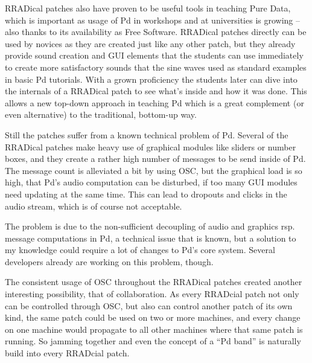 \documentclass[10pt,english]{scrartcl}
\begin{document}
RRADical patches also have proven to be useful tools in teaching Pure Data,
which is important as usage of Pd in workshops and at universities is
growing -- also thanks to its availability as Free Software. RRADical
patches directly can be used by novices as they are created just like any
other patch, but they already provide sound creation and GUI elements that
the students can use immediately to create more satisfactory sounds that the
sine waves used as standard examples in basic Pd tutorials. With a grown
proficiency the students later can dive into the internals of a RRADical
patch to see what's inside and how it was done.  This allows a new top-down
approach in teaching Pd which is a great complement (or even alternative) to
the traditional, bottom-up way.

Still the patches suffer from a known technical problem of Pd. Several of
the RRADical patches make heavy use of graphical modules like sliders or
number boxes, and they create a rather high number of messages to be send
inside of Pd. The message count is alleviated a bit by using OSC, but the
graphical load is so high, that Pd's audio computation can be disturbed, if
too many GUI modules need updating at the same time. This can lead to
dropouts and clicks in the audio stream, which is of course not acceptable.

The problem is due to the non-sufficient decoupling of audio and graphics
rsp. message computations in Pd, a technical issue that is known, but a
solution to my knowledge could require a lot of changes to Pd's core system.
Several developers already are working on this problem, though.

The consistent usage of OSC throughout the RRADical patches created another
interesting possibility, that of collaboration. As every RRADcial patch not
only can be controlled through OSC, but also can control another patch of
its own kind, the same patch could be used on two or more machines, and
every change on one machine would propagate to all other machines where that
same patch is running. So jamming together and even the concept of a ``Pd
band'' is naturally build into every RRADcial patch.
\end{document}
